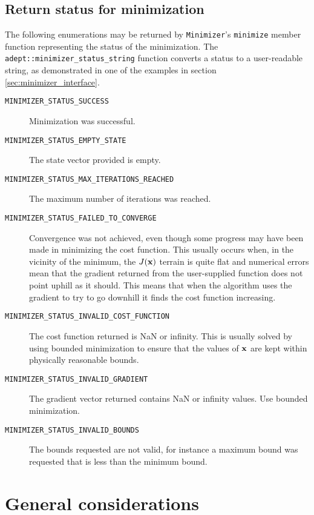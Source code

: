 \documentclass[a4,oneside]{book}
\def\codesize{\small}
\def\code#1{{\codesize\texttt{#1}}}
\def\citem#1{\item[{\codesize\texttt{#1}}]}
\begin{document}
\section{Return status for minimization}
\label{sec:minimizer_status}
The following enumerations may be returned by \code{Minimizer}'s
\code{minimize} member function representing the status of the
minimization. The \code{adept::minimizer\_status\_string} function
converts a status to a user-readable string, as demonstrated
in one of the examples in section \ref{sec:minimizer_interface}.
\begin{description}
\citem{MINIMIZER\_STATUS\_SUCCESS} Minimization was successful.
%
\citem{MINIMIZER\_STATUS\_EMPTY\_STATE}  The state vector provided is empty.
%
\citem{MINIMIZER\_STATUS\_MAX\_ITERATIONS\_REACHED} The maximum number
of iterations was reached.
%
\citem{MINIMIZER\_STATUS\_FAILED\_TO\_CONVERGE} Convergence was not
achieved, even though some progress may have been made in minimizing
the cost function. This usually occurs when, in the vicinity of the
minimum, the $J({\bf x})$ terrain is quite flat and numerical errors
mean that the gradient returned from the user-supplied function does
not point uphill as it should.  This means that when the algorithm
uses the gradient to try to go downhill it finds the cost function
increasing.
%
\citem{MINIMIZER\_STATUS\_INVALID\_COST\_FUNCTION} The cost function
returned is NaN or infinity. This is usually solved by using bounded
minimization to ensure that the values of ${\bf x}$ are kept within
physically reasonable bounds.
\citem{MINIMIZER\_STATUS\_INVALID\_GRADIENT} The gradient vector
returned contains NaN or infinity values. Use bounded minimization.
%
\citem{MINIMIZER\_STATUS\_INVALID\_BOUNDS} The bounds requested are
not valid, for instance a maximum bound was requested that is less
than the minimum bound.
\end{description}


\chapter{General considerations}
\label{chap:gen}
\end{document}
